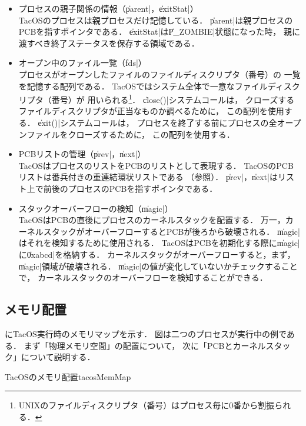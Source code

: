 \begin{itemize}
\item プロセスの親子関係の情報（\|parent|，\|exitStat|） \\
TacOSのプロセスは親プロセスだけ記憶している．
\|parent|は親プロセスのPCBを指すポインタである．
\|exitStat|は\|P_ZOMBIE|状態になった時，
親に渡すべき終了ステータスを保存する領域である．

\item オープン中のファイル一覧（\|fds|） \\
プロセスがオープンしたファイルのファイルディスクリプタ（番号）の
一覧を記憶する配列である．
TacOSではシステム全体で一意なファイルディスクリプタ（番号）が
用いられる\footnote{
UNIXのファイルディスクリプタ（番号）はプロセス毎に0番から割振られる．}．
\|close()|システムコールは，
クローズするファイルディスクリプタが正当なものか調べるために，
この配列を使用する．
\|exit()|システムコールは，
プロセスを終了する前にプロセスの全オープンファイルをクローズするために，
この配列を使用する．

\item PCBリストの管理（\|prev|，\|next|） \\
TacOSはプロセスのリストをPCBのリストとして表現する．
TacOSのPCBリストは番兵付きの重連結環状リストである
（参照）．
\|prev|，\|next|はリスト上で前後のプロセスのPCBを指すポインタである．

\item スタックオーバーフローの検知（\|magic|） \\
TacOSはPCBの直後にプロセスのカーネルスタックを配置する．
万一，カーネルスタックがオーバーフローするとPCBが後ろから破壊される．
\|magic|はそれを検知するために使用される．
TacOSはPCBを初期化する際に\|magic|に\|0xabcd|を格納する．
カーネルスタックがオーバーフローすると，まず，\|magic|領域が破壊される．
\|magic|の値が変化していないかチェックすることで，
カーネルスタックのオーバーフローを検知することができる．
\end{itemize}

\subsection{メモリ配置}
にTacOS実行時のメモリマップを示す．
図は二つのプロセスが実行中の例である．
まず「物理メモリ空間」の配置について，
次に「PCBとカーネルスタック」について説明する．

{TacOSのメモリ配置}{tacosMemMap}

